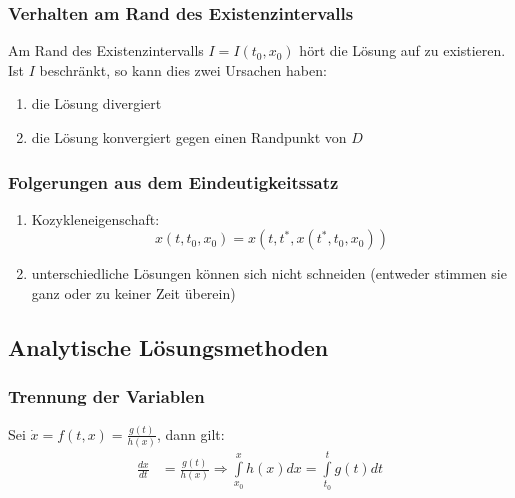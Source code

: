 \documentclass[a4paper,twocolumn,10pt]{article}
\begin{document}
\subsubsection{Verhalten am Rand des Existenzintervalls}
Am Rand des Existenzintervalls $I=I(t_0,x_0)$ hört die Lösung auf zu existieren.\\
Ist $I$ beschränkt, so kann dies zwei Ursachen haben:
\begin{enumerate}[label=$\bullet$]
\item die Lösung divergiert
\item die Lösung konvergiert gegen einen Randpunkt von $D$
\end{enumerate}

\subsubsection{Folgerungen aus dem Eindeutigkeitssatz}
\begin{enumerate}[label=$\bullet$]
\item Kozykleneigenschaft:
\begin{equation*}
x(t,t_0,x_0)=x(t,t^*,x(t^*,t_0,x_0))
\end{equation*}
\item unterschiedliche Lösungen können sich nicht schneiden (entweder stimmen sie ganz oder zu keiner Zeit überein)
\end{enumerate}

\subsection{Analytische Lösungsmethoden}

\subsubsection{Trennung der Variablen}
Sei $\dot{x}=f(t,x)=\frac{g(t)}{h(x)}$, dann gilt:
\begin{equation*}
\begin{split}
\frac{dx}{dt}&=\frac{g(t)}{h(x)}\Rightarrow \int\limits_{x_0}^{x} h(x)dx=\int\limits_{t_0}^{t} g(t)dt
\end{split}
\end{equation*}
\end{document}
